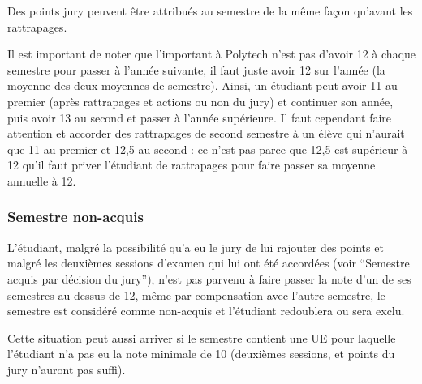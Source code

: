 \documentclass[letter, 11pt] {article}
\begin{document}
		Des points jury peuvent être attribués au semestre de la même façon qu’avant les rattrapages.


		Il est important de noter que l’important à Polytech n’est pas d’avoir 12 à chaque semestre pour passer à l’année suivante, il faut juste avoir 12 sur l’année (la moyenne des deux moyennes de semestre). Ainsi, un étudiant peut avoir 11 au premier (après rattrapages et actions ou non du jury) et continuer son année, puis avoir 13 au second et passer à l’année supérieure. Il faut cependant faire attention et accorder des rattrapages de second semestre à un élève qui n’aurait que 11 au premier et 12,5 au second : ce n’est pas parce que 12,5 est supérieur à 12 qu’il faut priver l’étudiant de rattrapages pour faire passer sa moyenne annuelle à 12.

		\subsubsection*{Semestre non-acquis}

		L’étudiant, malgré la possibilité qu’a eu le jury de lui rajouter des points et malgré les deuxièmes sessions d’examen qui lui ont été accordées (voir “Semestre acquis par décision du jury”), n’est pas parvenu à faire passer la note d’un de ses semestres au dessus de 12, même par compensation avec l’autre semestre, le semestre est considéré comme non-acquis et l’étudiant redoublera ou sera exclu.

		Cette situation peut aussi arriver si le semestre contient une UE pour laquelle l’étudiant n’a pas eu la note minimale de 10 (deuxièmes sessions, et points du jury n’auront pas suffi).	
\end{document}
